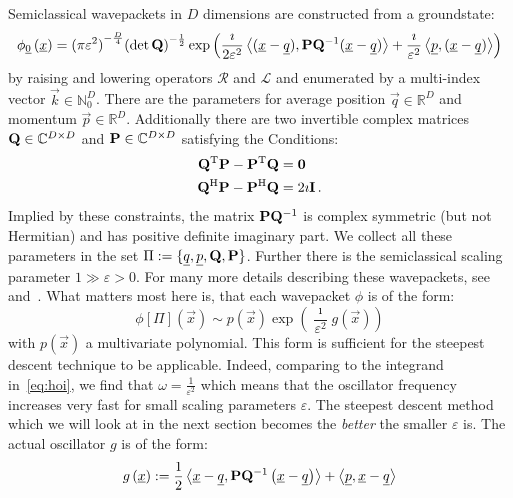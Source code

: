 \documentclass[a4paper,10pt]{article}
\begin{document}
Semiclassical wavepackets in $D$ dimensions are constructed from a groundstate:
\begin{align*}
  \phi_{\underline{0}}\left(\underline{x}\right)
  =
  {(\pi\varepsilon^2)}^{-\frac{D}{4}} {(\det\mathbf{Q})}^{-\frac{1}{2}}
  \exp \left( \frac{\imath}{2\varepsilon^2}
  \left\langle (\underline{x}-\underline{q}) , \mathbf{P}\mathbf{Q}{}^{-1}(\underline{x}-\underline{q}) \right\rangle
  + \frac{\imath}{\varepsilon^2} \left\langle \underline{p} , (\underline{x}-\underline{q}) \right\rangle
  \right)
\end{align*}
by raising and lowering operators $\mathcal{R}$ and $\mathcal{L}$
and enumerated by a multi-index vector $\vec{k} \in \mathbb{N}_0^D$.
There are the parameters for average position $\vec{q} \in \mathbb{R}^D$
and momentum $\vec{p} \in \mathbb{R}^D$. Additionally there are two invertible
complex matrices $\mathbf{Q} \in \mathbb{C}^{D \times D}$ and $\mathbf{P} \in \mathbb{C}^{D \times D}$
satisfying the Conditions:
\begin{align}
  \mathbf{Q}{}^{\textnormal{T}}\mathbf{P} - \mathbf{P}{}^{\textnormal{T}}\mathbf{Q} &= \mathbf{0} \\
  \mathbf{Q}{}^{\textnormal{H}}\mathbf{P} - \mathbf{P}{}^{\textnormal{H}}\mathbf{Q} &= 2\imath\mathbf{I} \,.
\end{align}
Implied by these constraints, the matrix $\mathbf{P}\mathbf{Q}{}^{-1}$ is complex symmetric
(but not Hermitian) and has positive definite imaginary part.
We collect all these parameters in the set $\Pi := \{\underline{q}, \underline{p}, \mathbf{Q}, \mathbf{P}\}$.
Further there is the semiclassical scaling parameter $1 \gg \varepsilon > 0$.
For many more details describing these wavepackets, see~\cite{H_ladder_operators}
and~\cite{B_master_thesis}.
What matters most here is, that each wavepacket $\phi$ is of the form:
\begin{equation}
  \phi[\Pi](\vec{x}) \sim p\left(\vec{x}\right)
                          \exp\left(\frac{\imath}{\varepsilon^2} g\left(\vec{x}\right)\right)
\end{equation}
with $p(\vec{x})$ a multivariate polynomial.
This form is sufficient for the steepest descent technique to be applicable.
Indeed, comparing to the integrand in~\eqref{eq:hoi},
we find that $\omega = \frac{1}{\varepsilon^2}$ which means that the oscillator
frequency increases very fast for small scaling parameters $\varepsilon$.
The steepest descent method which we will look at in the next section becomes
the \emph{better} the smaller $\varepsilon$ is. The actual oscillator $g$ is of the form:
\begin{equation}
  g\left(\underline{x}\right)
  :=
  \frac{1}{2} \left\langle \underline{x}-\underline{q} , \mathbf{P}\mathbf{Q}{}^{-1} \left(\underline{x}-\underline{q}\right) \right\rangle
  +
  \left\langle \underline{p} , \underline{x}-\underline{q} \right\rangle
\end{equation}
\end{document}

